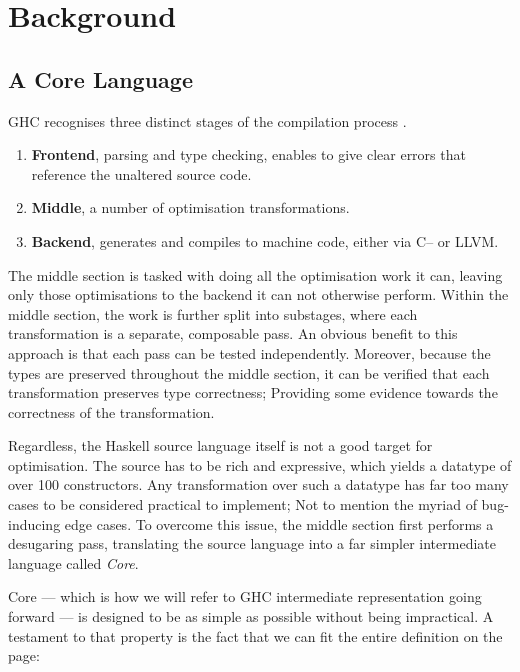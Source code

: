 \chapter{Background}

\section{A Core Language}
\label{section:background:core_lang}

GHC recognises three distinct stages of the compilation process \cite{haskell_optimisations_1997}.

\begin{enumerate}
  \item \textbf{Frontend}, parsing and type checking, enables to give clear errors that reference the unaltered source code.
  \item \textbf{Middle}, a number of optimisation transformations.
  \item \textbf{Backend}, generates and compiles to machine code, either via C-- or LLVM.
\end{enumerate}

The middle section is tasked with doing all the optimisation work it can, leaving only those optimisations to the backend
it can not otherwise perform. Within the middle section, the work is further split into substages, where each transformation
is a separate, composable pass. An obvious benefit to this approach is that each pass can be tested independently. Moreover, because
the types are preserved throughout the middle section, it can be verified that each transformation preserves type correctness;
Providing some evidence towards the correctness of the transformation.

Regardless, the Haskell source language itself is not a good target for optimisation. The source has to be
rich and expressive, which yields a datatype of over 100 constructors. Any transformation over such a datatype has far too
many cases to be considered practical to implement; Not to mention the myriad of bug-inducing edge cases. To overcome this issue, the
middle section first performs a desugaring pass, translating the source language into a far simpler intermediate language
called \textit{Core}. 

Core --- which is how we will refer to GHC intermediate representation going forward --- is designed to be as simple as possible
without being impractical. A testament to that property is the fact that we can fit the entire definition on the page:

